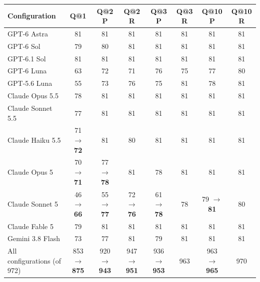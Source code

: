 \begin{tabular}{lccccccc}
\toprule
Configuration & Q@1 & Q@2 P & Q@2 R & Q@3 P & Q@3 R & Q@10 P & Q@10 R \\
\midrule
GPT-6 Astra & 81 & 81 & 81 & 81 & 81 & 81 & 81 \\
GPT-6 Sol & 79 & 80 & 81 & 81 & 81 & 81 & 81 \\
GPT-6.1 Sol & 81 & 81 & 81 & 81 & 81 & 81 & 81 \\
GPT-6 Luna & 63 & 72 & 71 & 76 & 75 & 77 & 80 \\
GPT-5.6 Luna & 55 & 73 & 76 & 75 & 81 & 78 & 81 \\
Claude Opus 5.5 & 78 & 81 & 81 & 81 & 81 & 81 & 81 \\
Claude Sonnet 5.5 & 77 & 81 & 81 & 81 & 81 & 81 & 81 \\
Claude Haiku 5.5 & 71 $\to$ \textbf{72} & 81 & 80 & 81 & 81 & 81 & 81 \\
Claude Opus 5 & 70 $\to$ \textbf{71} & 77 $\to$ \textbf{78} & 81 & 78 & 81 & 81 & 81 \\
Claude Sonnet 5 & 46 $\to$ \textbf{66} & 55 $\to$ \textbf{77} & 72 $\to$ \textbf{76} & 61 $\to$ \textbf{78} & 78 & 79 $\to$ \textbf{81} & 80 \\
Claude Fable 5 & 79 & 81 & 81 & 81 & 81 & 81 & 81 \\
Gemini 3.8 Flash & 73 & 77 & 81 & 79 & 81 & 81 & 81 \\
\midrule
All configurations (of 972) & 853 $\to$ \textbf{875} & 920 $\to$ \textbf{943} & 947 $\to$ \textbf{951} & 936 $\to$ \textbf{953} & 963 & 963 $\to$ \textbf{965} & 970 \\
\bottomrule
\end{tabular}

